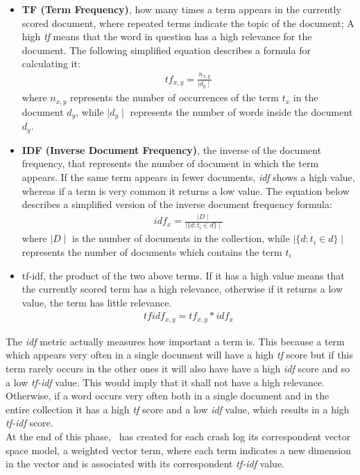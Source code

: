 \begin{itemize}
\item \textbf{TF (Term Frequency)}, \ie how many times a term appears in the currently scored document, where repeated terms indicate the topic of the document; A high \textit{tf} means that the word in question has a high relevance for the document. The following simplified equation \cite{tfidf} describes a formula for calculating it:
\begin{align*}
tf_{x,y} = \frac{n_{x,y}}{\mid d_{y} \mid}
\end{align*}
where $n_{x,y}$ represents the number of occurrences of the term $t_x$ in the document $d_{y}$, while $\mid d_{y} \mid$ represents the number of words inside the document $d_{y}$.

\item \textbf{IDF (Inverse Document Frequency)}, \ie the inverse of the document frequency, that represents the number of document in which the term appears. 
If the same term appears in fewer documents, \textit{idf} shows a high value, whereas if a term is very common it returns a low value. 
The equation \cite{tfidf} below describes a simplified version of the inverse document frequency formula: 
\begin{align*}
idf_{x} = \frac{\mid D \mid}{\mid \{d: t_{i} \in d\} \mid}
\end{align*}
where $\mid D \mid$ is the number of documents in the collection, while $\mid \{d: t_{i} \in d\} \mid$ represents the number of documents which contains the term $t_i$

\item tf-idf, \ie the product of the two above terms. If it has a high value means that the currently scored term has a high relevance, otherwise if it returns a low value, the term has little relevance.
\begin{align*}
tfidf_{x,y} = tf_{x,y}*idf_{x}
\end{align*}

\end{itemize}
The \textit{idf} metric actually measures how important a term is. 
This because a term which appears very often in a single document will have a high \textit{tf} score but if this term rarely occurs in the other ones it will also have have a high \textit{idf} score and so a low \textit{tf-idf} value. 
This would imply that it shall not have a high relevance. 
Otherwise, if a word occurs very often both in a single document and in the entire collection it has a high \textit{tf} score and a low \textit{idf} value, which results in a high \textit{tf-idf} score. \\
At the end of this phase, \toolname\ has created for each crash log its correspondent vector space model, \ie a weighted vector term, where each term indicates a new dimension in the vector and is associated with its correspondent \textit{tf-idf} value. 


